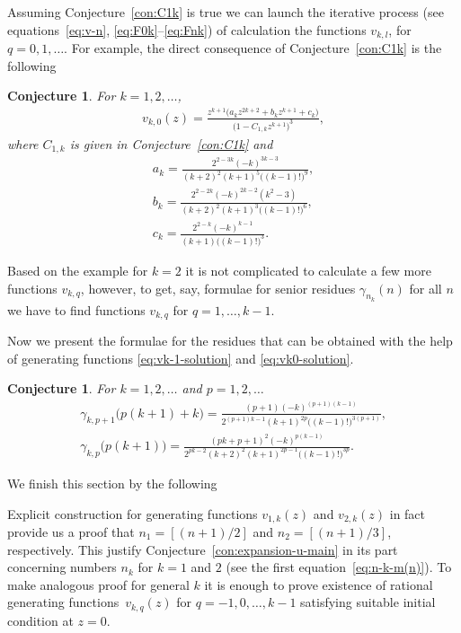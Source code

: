 \documentclass[pdftex]{sigma}
\numberwithin{equation}{section}
\newtheorem{Conjecture}[Theorem]{Conjecture}
\begin{document}
Assuming Conjecture~\ref{con:C1k} is true we can launch the iterative process
(see equations~\eqref{eq:v-n}, \eqref{eq:F0k}--\eqref{eq:Fnk}) of calculation the
functions $v_{k,l}$, for $q=0,1,\ldots$. For example, the direct consequence of
Conjecture~\ref{con:C1k} is the following
\begin{Conjecture}\label{con:vk0}
For $k=1,2,\ldots$,
\begin{gather}\label{eq:vk0-solution}
v_{k,0}(z)=\frac{z^{k+1}\big(a_kz^{2k+2}+b_kz^{k+1}+c_k\big)}{\big(1-C_{1,k}z^{k+1}\big)^3},
\end{gather}
where $C_{1,k}$ is given in Conjecture~{\rm \ref{con:C1k}} and
\begin{gather*}
a_k =\frac{2^{2-3k}(-k)^{3k-3}}{(k+2)^2(k+1)^5\big((k-1)!\big)^9},\\
b_k =\frac{2^{2-2k}(-k)^{2k-2}(k^2-3)}{(k+2)^2(k+1)^3\big((k-1)!\big)^6},\\
c_k =\frac{2^{2-k}(-k)^{k-1}}{(k+1)\big((k-1)!\big)^3}.
\end{gather*}
\end{Conjecture}
Based on the example for $k=2$ it is not complicated to calculate a few more functions $v_{k,q}$, however,
to get, say, formulae for senior residues $\gamma_{n_k}(n)$ for all $n$ we have to find functions $v_{k,q}$
for $q=1,\ldots,k-1$.

Now we present the formulae for the residues that can be obtained with the help of
generating functions \eqref{eq:vk-1-solution} and \eqref{eq:vk0-solution}.
\begin{Conjecture}For $k=1,2,\ldots$ and $p=1,2,\ldots$
\begin{gather*}
\gamma_{k,p+1}\big(p(k+1)+k\big)=\frac{(p+1)(-k)^{(p+1)(k-1)}}{2^{(p+1)k-1}(k+1)^{2p}\big((k-1)!\big)^{3(p+1)}},\\
\gamma_{k,p}\big(p(k+1)\big)=\frac{(pk+p+1)^2(-k)^{p(k-1)}}{2^{pk-2}(k+2)^2(k+1)^{2p-1}\big((k-1)!\big)^{3p}}.
\end{gather*}
\end{Conjecture}
We finish this section by the following
\begin{Remark}
Explicit construction for generating functions $v_{1,k}(z)$ and $v_{2,k}(z)$ in fact provide us a proof
that $n_1=\left[(n+1)/2\right]$ and $n_2=\left[(n+1)/3\right]$, respectively. This justify
Conjecture~\ref{con:expansion-u-main} in its part concerning numbers $n_k$ for $k=1$ and $2$
(see the first equation~\eqref{eq:n-k-m(n)}). To make analogous proof for general $k$ it is enough to
prove existence of rational generating func\-tions~$v_{k,q}(z)$ for $q=-1,0,\ldots,k-1$ satisfying suitable
initial condition at $z=0$.
\end{Remark}
\end{document}
